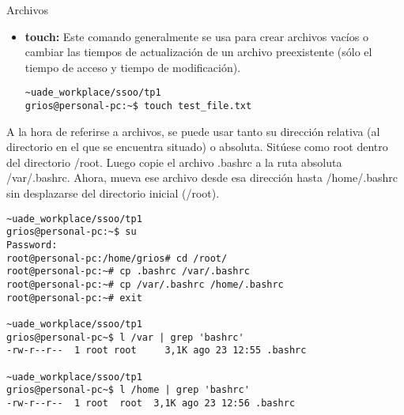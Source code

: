 \begin{section}{Archivos}
\begin{itemize}
\item \textbf{touch:}
Este comando generalmente se usa para crear archivos vacíos o cambiar las tiempos de actualización de un archivo preexistente (sólo el tiempo de acceso y tiempo de modificación).
\begin{lstlisting}[style=Ubuntu]
~uade_workplace/ssoo/tp1
grios@personal-pc:~$ touch test_file.txt
\end{lstlisting}
\end{itemize}


\begin{quoting}
A la hora de referirse a archivos, se puede usar tanto su dirección relativa (al directorio en el que se
encuentra situado) o absoluta. Sitúese como root dentro del directorio /root. Luego copie el archivo .bashrc
a la ruta absoluta /var/.bashrc. Ahora, mueva ese archivo desde esa dirección hasta /home/.bashrc sin
desplazarse del directorio inicial (/root).
\end{quoting}

\begin{lstlisting}[style=Ubuntu]
~uade_workplace/ssoo/tp1
grios@personal-pc:~$ su
Password: 
root@personal-pc:/home/grios# cd /root/
root@personal-pc:~# cp .bashrc /var/.bashrc
root@personal-pc:~# cp /var/.bashrc /home/.bashrc
root@personal-pc:~# exit

~uade_workplace/ssoo/tp1
grios@personal-pc~$ l /var | grep 'bashrc' 
-rw-r--r--  1 root root     3,1K ago 23 12:55 .bashrc

~uade_workplace/ssoo/tp1
grios@personal-pc~$ l /home | grep 'bashrc' 
-rw-r--r--  1 root  root  3,1K ago 23 12:56 .bashrc
                                                             
\end{lstlisting}

\end{section}